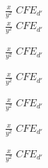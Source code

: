 \documentclass{article}
\newcommand{\asd}{
    $\frac{x}{y^{2}}$    %
    $CFE_{d'}$           %
}
\begin{document}
    \asd\\

    \asd\asd\asd\asd\asd\asd
\end{document}
